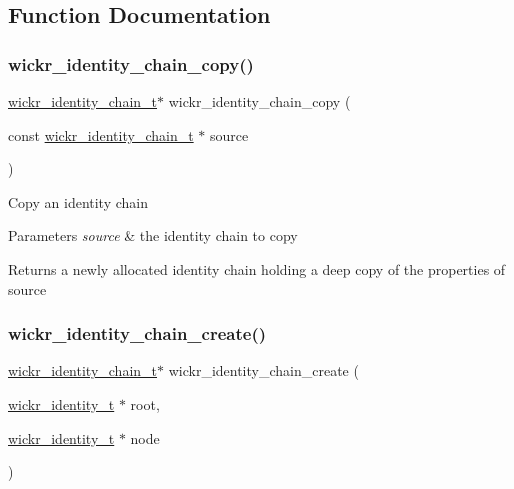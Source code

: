\subsection{Function Documentation}
\mbox{\label{group__wickr__identity_gac9d708d340abcd0b54d87434b71d2d9e}} 
\subsubsection{\texorpdfstring{wickr\+\_\+identity\+\_\+chain\+\_\+copy()}{wickr\_identity\_chain\_copy()}}
{\footnotesize\ttfamily \mbox{\hyperlink{structwickr__identity__chain}{wickr\+\_\+identity\+\_\+chain\+\_\+t}}$\ast$ wickr\+\_\+identity\+\_\+chain\+\_\+copy (\begin{DoxyParamCaption}\item[{const \mbox{\hyperlink{structwickr__identity__chain}{wickr\+\_\+identity\+\_\+chain\+\_\+t}} $\ast$}]{source }\end{DoxyParamCaption})}

Copy an identity chain


\begin{DoxyParams}{Parameters}
{\em source} & the identity chain to copy \\
\hline
\end{DoxyParams}
\begin{DoxyReturn}{Returns}
a newly allocated identity chain holding a deep copy of the properties of \textquotesingle{}source\textquotesingle{} 
\end{DoxyReturn}
\mbox{\label{group__wickr__identity_ga79551385194ba6b044b676ce5c7400e6}} 
\subsubsection{\texorpdfstring{wickr\+\_\+identity\+\_\+chain\+\_\+create()}{wickr\_identity\_chain\_create()}}
{\footnotesize\ttfamily \mbox{\hyperlink{structwickr__identity__chain}{wickr\+\_\+identity\+\_\+chain\+\_\+t}}$\ast$ wickr\+\_\+identity\+\_\+chain\+\_\+create (\begin{DoxyParamCaption}\item[{\mbox{\hyperlink{structwickr__identity}{wickr\+\_\+identity\+\_\+t}} $\ast$}]{root,  }\item[{\mbox{\hyperlink{structwickr__identity}{wickr\+\_\+identity\+\_\+t}} $\ast$}]{node }\end{DoxyParamCaption})}

